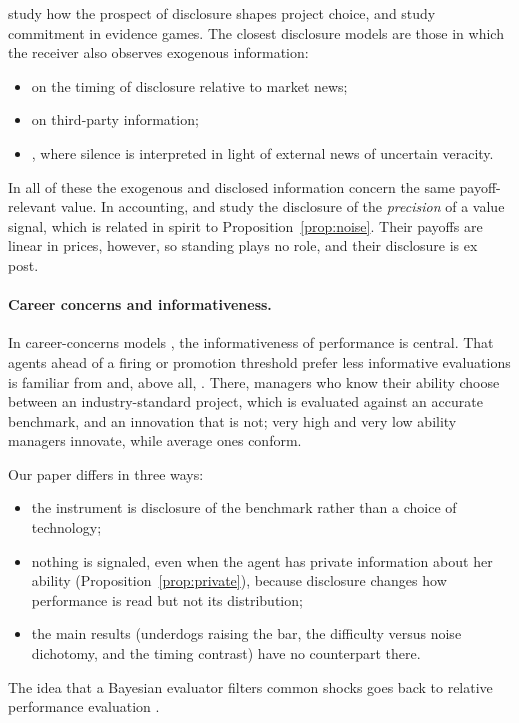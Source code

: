 \documentclass[11pt]{article}
\theoremstyle{definition}
\begin{document}
\citet{BenPorathDekelLipman2018} study how the prospect of disclosure shapes project choice, and \citet{HartKremerPerry2017} study commitment in evidence games. The closest disclosure models are those in which the receiver also observes exogenous information:
\begin{itemize}
\item \citet{AcharyaDeMarzoKremer2011} on the timing of disclosure relative to market news;
\item \citet{FrenkelGuttmanKremer2020} on third-party information;
\item \citet{LibgoberMichaeliWiedman2023}, where silence is interpreted in light of external news of uncertain veracity.
\end{itemize}
In all of these the exogenous and disclosed information concern the same payoff-relevant value. In accounting, \citet{HughesPae2004} and \citet{KimPae2025} study the disclosure of the \emph{precision} of a value signal, which is related in spirit to Proposition~\ref{prop:noise}. Their payoffs are linear in prices, however, so standing plays no role, and their disclosure is ex post.

\paragraph{Career concerns and informativeness.} In career-concerns models \citep{Holmstrom1999,DewatripontJewittTirole1999}, the informativeness of performance is central. That agents ahead of a firing or promotion threshold prefer less informative evaluations is familiar from \citet{Hermalin1993} and, above all, \citet{Zwiebel1995}. There, managers who know their ability choose between an industry-standard project, which is evaluated against an accurate benchmark, and an innovation that is not; very high and very low ability managers innovate, while average ones conform.

Our paper differs in three ways:
\begin{itemize}
\item the instrument is disclosure of the benchmark rather than a choice of technology;
\item nothing is signaled, even when the agent has private information about her ability (Proposition~\ref{prop:private}), because disclosure changes how performance is read but not its distribution;
\item the main results (underdogs raising the bar, the difficulty versus noise dichotomy, and the timing contrast) have no counterpart there.
\end{itemize}
The idea that a Bayesian evaluator filters common shocks goes back to relative performance evaluation \citep{Holmstrom1982}.
\end{document}
